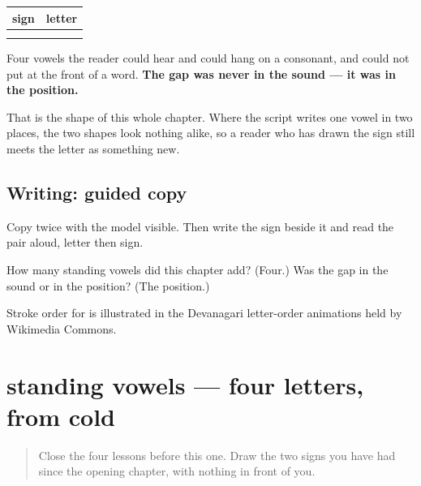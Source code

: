 \begin{grammarlens}[title={Grammar Lens: the four, and what they have in common}]
\noindent
\begin{tabularx}{\linewidth}{@{}>{\raggedright\arraybackslash}X>{\raggedright\arraybackslash}X@{}}
\toprule
\textbf{sign} & \textbf{letter} \\
\midrule
\mr{◌ी} \mr{◌ो} & \mr{ई} \mr{ओ} \\
\mr{◌ै} \mr{◌ौ} & \mr{ऐ} \mr{औ} \\
\bottomrule
\end{tabularx}

Four vowels the reader could hear and could hang on a consonant, and could not put at the front of a word. \textbf{The gap was never in the sound — it was in the position.}

That is the shape of this whole chapter. Where the script writes one vowel in two places, the two shapes look nothing alike, so a reader who has drawn the sign still meets the letter as something new.
\end{grammarlens}

\subsection*{Writing: guided copy}

Copy \textbf{} twice with the model visible. Then write the \textbf{} sign beside it and read the pair aloud, letter then sign.

\begin{tcolorbox}[breakable,colback=teal!4,colframe=teal!35!black,title={Before you move on}]
How many standing vowels did this chapter add? (Four.) Was the gap in the sound or in the position? (The position.)

Stroke order for \textbf{} is illustrated in the Devanagari letter-order animations held by Wikimedia Commons.
\end{tcolorbox}
\section[standing vowels (ubhe svara)]{standing vowels — four letters, from cold}

\label{lesson:MR-R65-standing-vowels}



\begin{quote}
Close the four lessons before this one. Draw the two signs you have had since the opening chapter, with nothing in front of you.
\end{quote}

